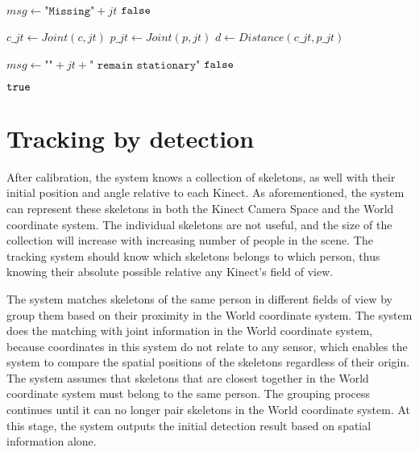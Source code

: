 \begin{algorithm}[!h,width=0.9\columnwidth]
    \caption{$\Function{IsStationary}(jt, c, p, msg)$}
    \\
    \label{algo:algo_interference}
    \begin{algorithmic}[1]
        \setcounter{ALC@line}{0}
        \vspace*{1mm}

          \STATE $msg \leftarrow \texttt{"Missing"} + jt$
          \RETURN $\False$
        \ENDIF

        \STATE $c\_jt \leftarrow Joint(c, jt)$
        \STATE $p\_jt \leftarrow Joint(p, jt)$
        \STATE $d \leftarrow Distance(c\_jt, p\_jt)$

          \STATE $msg \leftarrow \texttt{""} + jt + \texttt{" remain stationary"}$
          \RETURN $\False$
        \ENDIF

        \RETURN $\True$
    \end{algorithmic}
\end{algorithm}

\section{Tracking by detection}
\label{sec:current_approach_tracking_by_detection}

After calibration, the system knows a collection of skeletons, as well with their initial position and angle relative to each Kinect. As aforementioned, the system can represent these skeletons in both the Kinect Camera Space and the World coordinate system. The individual skeletons are not useful, and the size of the collection will increase with increasing number of people in the scene. The tracking system should know which skeletons belongs to which person, thus knowing their absolute possible relative any Kinect's field of view.

The system matches skeletons of the same person in different fields of view by group them based on their proximity in the World coordinate system. The system does the matching with joint information in the World coordinate system, because coordinates in this system do not relate to any sensor, which enables the system to compare the spatial positions of the skeletons regardless of their origin. The system assumes that skeletons that are closest together in the World coordinate system must belong to the same person. The grouping process continues until it can no longer pair skeletons in the World coordinate system. At this stage, the system outputs the initial detection result based on spatial information alone.

